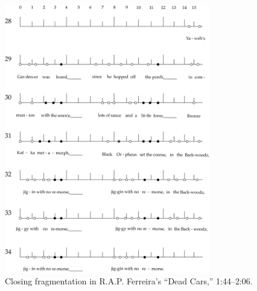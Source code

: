     \begin{figure}[!t]
        \centering
        \includegraphics[width=0.8\textwidth]{images/figures/chp 03/144206deadcarsendfrag.pdf}
        \caption{Closing fragmentation in R.A.P. Ferreira's ``Dead Cars,'' 1:44--2:06.}
        \label{fig:roryclosingfrag}
    \end{figure}

